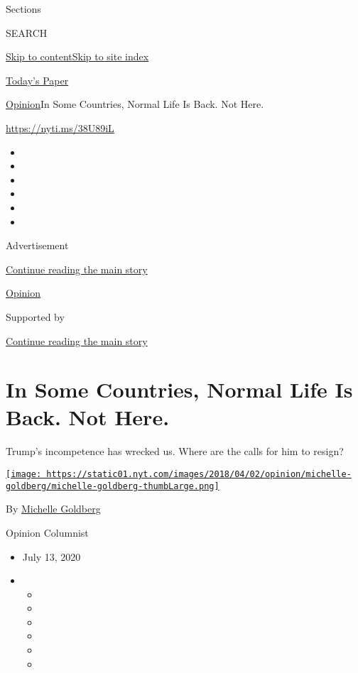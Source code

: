 Sections

SEARCH

\protect\hyperlink{site-content}{Skip to
content}\protect\hyperlink{site-index}{Skip to site index}

\href{https://myaccount.nytimes.com/auth/login?response_type=cookie\&client_id=vi}{}

\href{https://www.nytimes.com/section/todayspaper}{Today's Paper}

\href{/section/opinion}{Opinion}\textbar{}In Some Countries, Normal Life
Is Back. Not Here.

\href{https://nyti.ms/38U89iL}{https://nyti.ms/38U89iL}

\begin{itemize}
\item
\item
\item
\item
\item
\item
\end{itemize}

Advertisement

\protect\hyperlink{after-top}{Continue reading the main story}

\href{/section/opinion}{Opinion}

Supported by

\protect\hyperlink{after-sponsor}{Continue reading the main story}

\hypertarget{in-some-countries-normal-life-is-back-not-here}{%
\section{In Some Countries, Normal Life Is Back. Not
Here.}\label{in-some-countries-normal-life-is-back-not-here}}

Trump's incompetence has wrecked us. Where are the calls for him to
resign?

\href{https://www.nytimes.com/by/michelle-goldberg}{\texttt{[image: https://static01.nyt.com/images/2018/04/02/opinion/michelle-goldberg/michelle-goldberg-thumbLarge.png]}}

By \href{https://www.nytimes.com/by/michelle-goldberg}{Michelle
Goldberg}

Opinion Columnist

\begin{itemize}
\item
  July 13, 2020
\item
  \begin{itemize}
  \item
  \item
  \item
  \item
  \item
  \item
  \end{itemize}
\end{itemize}


